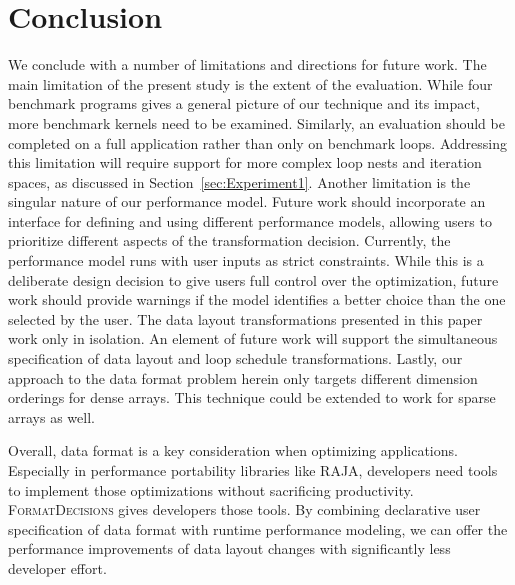 \documentclass[sigconf,review=true]{acmart}
\newcommand{\FormatDecisions}[0]{{\textsc{FormatDecisions}}}
\begin{document}
\section{Conclusion}


We conclude with a number of limitations and directions for future work.
The main limitation of the present study is the extent of the evaluation.
While four benchmark programs gives a general picture of our technique and its impact, more benchmark kernels need to be examined.
Similarly, an evaluation should be completed on a full application rather than only on benchmark loops.
Addressing this limitation will require support for more complex loop nests and iteration spaces, as discussed in Section~\ref{sec:Experiment1}.
Another limitation is the singular nature of our performance model.
Future work should incorporate an interface for defining and using different performance models, allowing users to prioritize different aspects of the transformation decision.
Currently, the performance model runs with user inputs as strict constraints.
While this is a deliberate design decision to give users full control over the optimization, future work should provide warnings if the model identifies a better choice than the one selected by the user. 
The data layout transformations presented in this paper work only in isolation. 
An element of future work will support the simultaneous specification of data layout and loop schedule transformations. 
Lastly, our approach to the data format problem herein only targets different dimension orderings for dense arrays. 
This technique could be extended to work for sparse arrays as well. 

Overall, data format is a key consideration when optimizing applications.
Especially in performance portability libraries like RAJA, developers need tools to implement those optimizations without sacrificing productivity.
\FormatDecisions{} gives developers those tools.
By combining declarative user specification of data format with runtime performance modeling, we can offer the performance improvements of data layout changes with significantly less developer effort.



\end{document}
